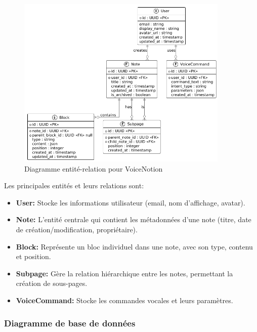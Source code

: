 \begin{figure}[H]
    \centering
    \includegraphics[width=0.9\textwidth]{assets/docs/voicenotion_er_diagram.png}
    \caption{Diagramme entité-relation pour VoiceNotion}
    \label{fig:er_diagram}
\end{figure}

Les principales entités et leurs relations sont:

\begin{itemize}
    \item \textbf{User:} Stocke les informations utilisateur (email, nom d'affichage, avatar).
    
    \item \textbf{Note:} L'entité centrale qui contient les métadonnées d'une note (titre, date de création/modification, propriétaire).
    
    \item \textbf{Block:} Représente un bloc individuel dans une note, avec son type, contenu et position.
    
    \item \textbf{Subpage:} Gère la relation hiérarchique entre les notes, permettant la création de sous-pages.
    
    \item \textbf{VoiceCommand:} Stocke les commandes vocales et leurs paramètres.
\end{itemize}

\subsubsection{Diagramme de base de données}

